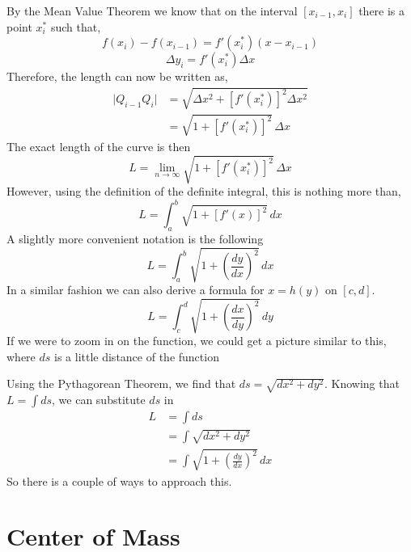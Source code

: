 \documentclass[10pt,reqno]{book}
\theoremstyle{definition}
\begin{document}
	By the Mean Value Theorem we know that on the interval $ [x_{i-1},x_i] $ there is a point $ x_i^* $ such that,
	\[ f(x_i) - f(x_{i-1}) = f'(x_i^*)(x-x_{i-1}) \]
	\[ \Delta y_i = f'(x_i^*) \Delta x \]
	Therefore, the length can now be written as,
	\begin{align*}
		\big| Q_{i-1} Q_i \big| &= \sqrt{ \Delta x^2 + [f'(x_i^*)]^2 \Delta x^2}\\
		&= \sqrt{1 + [f'(x_i^*)]^2} \, \Delta x
	\end{align*}		
	The exact length of the curve is then 
	\[ L = \lim\limits_{n \to \infty} \sqrt{1 + [f'(x_i^*)]^2} \, \Delta x \]
	However, using the definition of the definite integral, this is nothing more than,
	\[ L = \int_a^b \sqrt{1 + [f'(x)]^2}\,dx \]
	A slightly more convenient notation is the following 
	\[ L = \int_a^b \sqrt{1 + \left( \frac{dy}{dx} \right)^2}\,dx \]
	In a similar fashion we can also derive a formula for $ x = h(y) $ on $ [c,d] $. 
	\[ L = \int_c^d \sqrt{1 + \left( \frac{dx}{dy} \right)^2}\,dy \]
	If we were to zoom in on the function, we could get a picture similar to this, where $ ds $ is a little distance of the function
	
	\begin{center}
	\end{center}
	
	\noindent Using the Pythagorean Theorem, we find that $ ds = \sqrt{dx^2 + dy^2} $. Knowing that $ L = \int ds $, we can substitute $ ds $ in 
	\begin{align*}
		L &= \int ds\\
		&= \int \sqrt{dx^2 + dy^2}\\
		&= \int \sqrt{1 + \left( \frac{dy}{dx} \right)^2}\,dx
	\end{align*}
	So there is a couple of ways to approach this.
	
	
	\section{Center of Mass}
	
\end{document}
